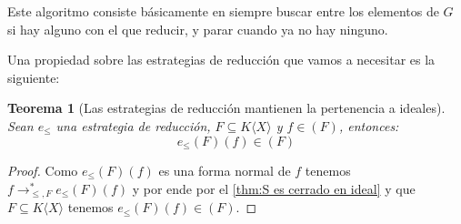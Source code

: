 \documentclass{amsbook} %
\theoremstyle{customstyle}
\newtheorem{theorem}{Teorema}[section]
\begin{document}
Este algoritmo consiste básicamente en siempre buscar entre los elementos de $G$ si hay alguno con el que reducir, y parar cuando ya no hay ninguno.

Una propiedad sobre las estrategias de reducción que vamos a necesitar es la siguiente:

\begin{theorem}[Las estrategias de reducción mantienen la pertenencia a ideales]\label{thm:e mantiene pertenencia a ideal}
Sean $e_≤$ una estrategia de reducción, $F ⊆ K⟨X⟩$ y $f ∈ (F)$, entonces:
\[ e_≤(F)(f) ∈ (F) \]
\end{theorem}
\begin{proof}
Como $e_≤(F)(f)$ es una forma normal de $f$ tenemos $f →^*_{≤, F} e_≤(F)(f)$ y por ende por el \cref{thm:S es cerrado en ideal} y que $F ⊆ K⟨X⟩$ tenemos $e_≤(F)(f) ∈ (F)$.
\end{proof}
\end{document}
